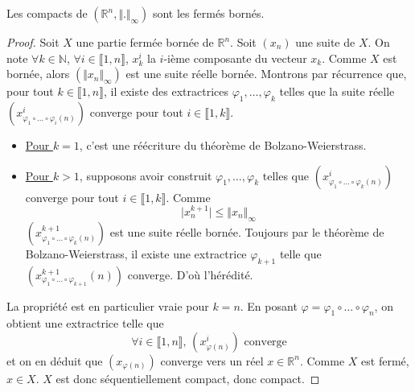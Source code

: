 






  \begin{lemma}
    \label{equivalence-des-normes-en-dimension-finie-et-theoreme-de-riesz-1}
    Les compacts de $(\mathbb{R}^n, \Vert . \Vert_\infty)$ sont les fermés bornés.
  \end{lemma}

  \begin{proof}
    Soit $X$ une partie fermée bornée de $\mathbb{R}^n$. Soit $(x_n)$ une suite de $X$. On note $\forall k \in \mathbb{N}$, $\forall i \in \llbracket 1, n \rrbracket$, $x_k^i$ la $i$-ième composante du vecteur $x_k$. Comme $X$ est bornée, alors $(\Vert x_n \Vert_\infty)$ est une suite réelle bornée. Montrons par récurrence que, pour tout $k \in \llbracket 1, n \rrbracket$, il existe des extractrices $\varphi_1, \dots, \varphi_k$ telles que la suite réelle $(x^i_{\varphi_1 \circ \dots \circ \varphi_i (n)})$ converge pour tout $i \in \llbracket 1, k \rrbracket$.
    \begin{itemize}
      \item \uline{Pour $k = 1$}, c'est une réécriture du théorème de Bolzano-Weierstrass.
      \item \uline{Pour $k > 1$}, supposons avoir construit $\varphi_1, \dots, \varphi_k$ telles que $(x^i_{\varphi_1 \circ \dots \circ \varphi_k (n)})$ converge pour tout $i \in \llbracket 1, k \rrbracket$. Comme
      \[ \vert x^{k+1}_n \vert \leq \Vert x_n \Vert_\infty \]
      $(x^{k+1}_{\varphi_1 \circ \dots \circ \varphi_k (n)})$ est une suite réelle bornée. Toujours par le théorème de Bolzano-Weierstrass, il existe une extractrice $\varphi_{k+1}$ telle que $(x^{k+1}_{\varphi_1 \circ \dots \circ \varphi_{k+1}}(n))$ converge. D'où l'hérédité.
    \end{itemize}
    La propriété est en particulier vraie pour $k = n$. En posant $\varphi = \varphi_1 \circ \dots \circ \varphi_n$, on obtient une extractrice telle que
    \[ \forall i \in \llbracket 1, n \rrbracket, \, (x^i_{\varphi(n)}) \text{ converge} \]
    et on en déduit que $(x_{\varphi(n)})$ converge vers un réel $x \in \mathbb{R}^n$. Comme $X$ est fermé, $x \in X$. $X$ est donc séquentiellement compact, donc compact.
  \end{proof}

